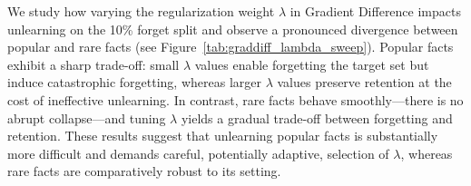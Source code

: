\documentclass[11pt]{article}
\begin{document}
{\begin{table}[h!t]
  \centering
  \small
  \setlength{\tabcolsep}{3pt}
  \caption{LLMs Performance After 5\% and 15\% Data Unlearning – Rare vs.\ Popular Splits}
  \label{tab:llm_unlearn_5_15}
\end{table}






We study how varying the regularization weight \(\lambda\) in Gradient Difference impacts unlearning on the 10\% forget split and observe a pronounced divergence between popular and rare facts (see Figure~\ref{tab:graddiff_lambda_sweep}). Popular facts exhibit a sharp trade-off: small \(\lambda\) values enable forgetting the target set but induce catastrophic forgetting, whereas larger \(\lambda\) values preserve retention at the cost of ineffective unlearning. In contrast, rare facts behave smoothly—there is no abrupt collapse—and tuning \(\lambda\) yields a gradual trade-off between forgetting and retention. These results suggest that unlearning popular facts is substantially more difficult and demands careful, potentially adaptive, selection of \(\lambda\), whereas rare facts are comparatively robust to its setting.


}
\end{document}
